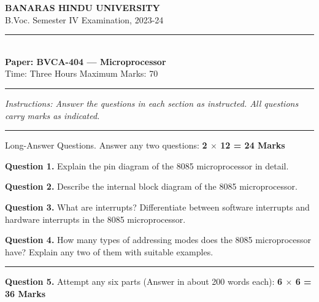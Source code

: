 \documentclass[11pt,a4paper]{article}
\begin{document}
\begin{center}
  {\large\bfseries BANARAS HINDU UNIVERSITY}\\[2pt]
  {\normalsize B.Voc. Semester IV Examination, 2023-24}\\[6pt]
  \rule{0.8\linewidth}{0.5pt}\\[6pt]
  {\large\bfseries Paper: BVCA-404 --- Microprocessor}\\[4pt]
  {\normalsize Time: Three Hours \hfill Maximum Marks: 70}
\end{center}

\rule{\linewidth}{0.4pt}

\smallskip



\noindent   \textit{Instructions: Answer the questions in each section as instructed. All questions carry marks as indicated.}

\bigskip




\rule{\linewidth}{0.4pt}\smallskip

Long-Answer Questions. Answer any two questions: \hfill   \textbf{2 $ \times$ 12 = 24 Marks}

\medskip



\noindent   \textbf{Question 1.} Explain the pin diagram of the 8085 microprocessor in detail.

\medskip



\noindent   \textbf{Question 2.} Describe the internal block diagram of the 8085 microprocessor.

\medskip



\noindent   \textbf{Question 3.} What are interrupts? Differentiate between software interrupts and hardware interrupts in the 8085 microprocessor.

\medskip



\noindent   \textbf{Question 4.} How many types of addressing modes does the 8085 microprocessor have? Explain any two of them with suitable examples.

\bigskip


\rule{\linewidth}{0.4pt}\smallskip




\noindent   \textbf{Question 5.} Attempt any six parts (Answer in about 200 words each): \hfill   \textbf{6 $ \times$ 6 = 36 Marks}
\end{document}
